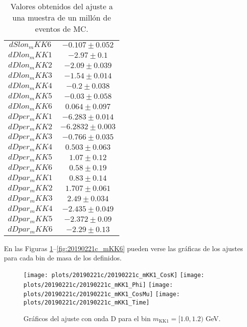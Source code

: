 \begin{table}[H]
\begin{multicols}{2}
\begin{tabular}{cc}
$dSlon_mKK6$&$  -0.107 \pm 0.052  $\\
$dDlon_mKK1$&$   -2.97 \pm 0.1    $\\
$dDlon_mKK2$&$  -2.09 \pm 0.039   $\\
$dDlon_mKK3$&$  -1.54 \pm 0.014   $\\
$dDlon_mKK4$&$   -0.2 \pm 0.038   $\\
$dDlon_mKK5$&$  -0.03 \pm 0.058   $\\
$dDlon_mKK6$&$  0.064 \pm 0.097   $\\
$dDper_mKK1$&$  -6.283 \pm 0.014  $\\
$dDper_mKK2$&$ -6.2832 \pm 0.003  $\\
$dDper_mKK3$&$  -0.766 \pm 0.035  $\\
$dDper_mKK4$&$  0.503 \pm 0.063   $\\
$dDper_mKK5$&$   1.07 \pm 0.12    $\\
$dDper_mKK6$&$   0.58 \pm 0.19    $\\
$dDpar_mKK1$&$   0.83 \pm 0.14    $\\
$dDpar_mKK2$&$  1.707 \pm 0.061   $\\
$dDpar_mKK3$&$   2.49 \pm 0.034   $\\
$dDpar_mKK4$&$  -2.435 \pm 0.049  $\\
$dDpar_mKK5$&$  -2.372 \pm 0.09   $\\
$dDpar_mKK6$&$   -2.29 \pm 0.13   $\\
\bottomrule
\end{tabular}
\end{multicols}
  \caption{Valores obtenidos del ajuste a una muestra de un millón de eventos  de MC.} \label{tab:fitDwaveparams}
\end{table}

En las Figuras \ref{fig:20190221c_mKK1}--\ref{fig:20190221c_mKK6} pueden verse las gráficas de los ajustes para cada bin de masa de los definidos.

\newpage

\begin{figure}[H]
\centering
\begin{multicols}{2}
\texttt{[image: plots/20190221c/20190221c\_mKK1\_CosK]}
\texttt{[image: plots/20190221c/20190221c\_mKK1\_Phi]}
\texttt{[image: plots/20190221c/20190221c\_mKK1\_CosMu]}
\texttt{[image: plots/20190221c/20190221c\_mKK1\_Time]}
\end{multicols}
\vspace*{-0.5cm}
\caption{Gráficos del ajuste con onda D para el bin $m_{\text{KK}1} = [1.0,1.2)$ GeV.}  \label{fig:20190221c_mKK1}
\end{figure}


